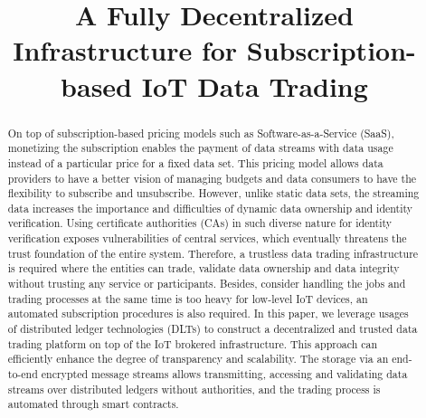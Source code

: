 \documentclass[conference]{IEEEtran}
\begin{document}
\title{A Fully Decentralized Infrastructure for Subscription-based IoT Data Trading}

\author{
}

\maketitle


\begin{abstract} 
On top of subscription-based pricing models such as Software-as-a-Service (SaaS), monetizing the subscription enables the payment of data streams with data usage instead of a particular price for a fixed data set. This pricing model allows data providers to have a better vision of managing budgets and data consumers to have the flexibility to subscribe and unsubscribe. However, unlike static data sets, the streaming data increases the importance and difficulties of dynamic data ownership and identity verification. Using certificate authorities (CAs) in such diverse nature for identity verification exposes vulnerabilities of central services, which eventually threatens the trust foundation of the entire system. Therefore, a trustless data trading infrastructure is required where the entities can trade, validate data ownership and data integrity without trusting any service or participants. Besides, consider handling the jobs and trading processes at the same time is too heavy for low-level IoT devices, an automated subscription procedures is also required. In this paper, we leverage usages of distributed ledger technologies (DLTs) to construct a decentralized and trusted data trading platform on top of the IoT brokered infrastructure. This approach can efficiently enhance the degree of transparency and scalability. The storage via an end-to-end encrypted message streams allows transmitting, accessing and validating data streams over distributed ledgers without authorities, and the trading process is automated through smart contracts.
\end{abstract}
\end{document}
